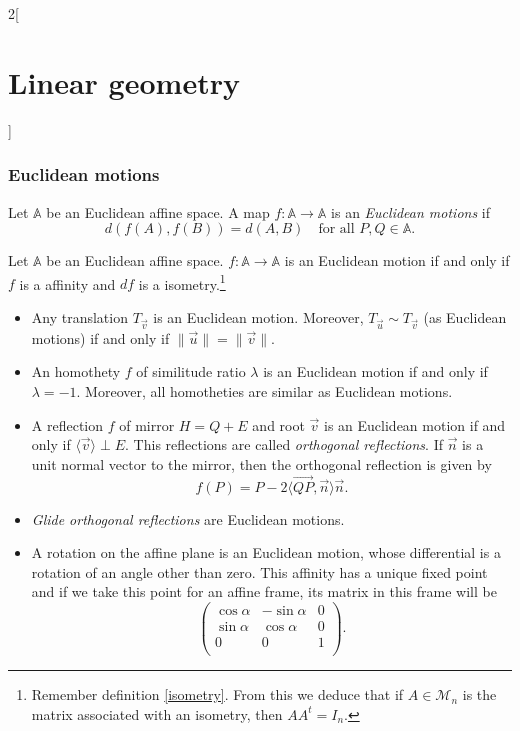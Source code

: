 \documentclass[class=article,10pt,crop=false]{standalone}
\begin{document}
\begin{multicols}{2}[\section{Linear geometry}]
\subsubsection{Euclidean motions}
\begin{definition}
Let $\mathbb{A}$ be an Euclidean affine space. A map $f:\mathbb{A}\rightarrow\mathbb{A}$ is an \textit{Euclidean motions} if $$d(f(A),f(B))=d(A,B)\quad\text{for all } P,Q\in\mathbb{A}.$$
\end{definition}
\begin{prop}
Let $\mathbb{A}$ be an Euclidean affine space. $f:\mathbb{A}\rightarrow\mathbb{A}$ is an Euclidean motion if and only if $f$ is a affinity and $df$ is a isometry.\footnote{Remember definition \ref{isometry}. From this we deduce that if $A\in\mathcal{M}_n$ is the matrix associated with an isometry, then $AA^t=I_n$.}
\end{prop}
\begin{prop}
\hfill
\begin{itemize}
    \item Any translation $T_{\overrightarrow{v}}$ is an Euclidean motion. Moreover, $T_{\overrightarrow{u}}\sim T_{\overrightarrow{v}}$ (as Euclidean motions) if and only if $\|\overrightarrow{u}\|=\|\overrightarrow{v}\|.$
    \item An homothety $f$ of similitude ratio $\lambda$ is an Euclidean motion if and only if $\lambda=-1$. Moreover, all homotheties are similar as Euclidean motions.
    \item A reflection $f$ of mirror $H=Q+E$ and root $\overrightarrow{v}$ is an Euclidean motion if and only if $\langle\overrightarrow{v}\rangle\perp E$. This reflections are called \textit{orthogonal reflections}. If $\overrightarrow{n}$ is a unit normal vector to the mirror, then the orthogonal reflection is given by $$f(P)=P-2\langle\overrightarrow{QP},\overrightarrow{n}\rangle\overrightarrow{n}.$$
    \item \textit{Glide orthogonal reflections} are Euclidean motions.
    \item A rotation on the affine plane is an Euclidean motion, whose differential is a rotation of an angle other than zero. This affinity has a unique fixed point and if we take this point for an affine frame, its matrix in this frame will be $$\begin{pmatrix}
    \cos\alpha & -\sin\alpha & 0\\
    \sin\alpha & \cos\alpha & 0\\
    0 & 0 & 1\\
    \end{pmatrix}.$$
\end{itemize}
\end{prop}

\end{multicols}
\end{document}
